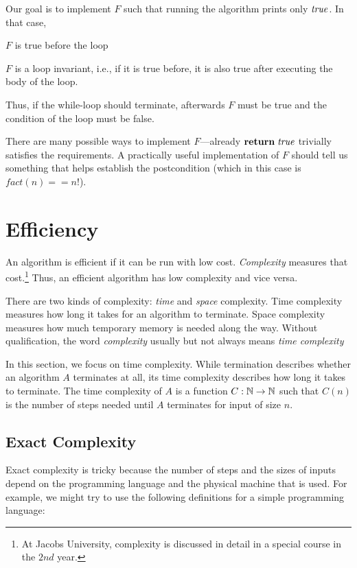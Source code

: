 Our goal is to implement $F$ such that running the algorithm prints only $\mathit{true}$.
In that case, 
\begin{compactitem}
 \item $F$ is true before the loop
 \item $F$ is a loop invariant, i.e., if it is true before, it is also true after executing the body of the loop.
\end{compactitem}
Thus, if the while-loop should terminate, afterwards $F$ must be true and the condition of the loop must be false.

There are many possible ways to implement $F$---already $\areturn{\true}$ trivially satisfies the requirements.
A practically useful implementation of $F$ should tell us something that helps establish the postcondition (which in this case is $fact(n)==n!$).


\section{Efficiency}\label{sec:ad:complex}

An algorithm is efficient if it can be run with low cost.
\emph{Complexity} measures that cost.\footnote{At Jacobs University, complexity is discussed in detail in a special course in the $2nd$ year.}
Thus, an efficient algorithm has low complexity and vice versa.

There are two kinds of complexity: \emph{time} and \emph{space} complexity.
Time complexity measures how long it takes for an algorithm to terminate.
Space complexity measures how much temporary memory is needed along the way.
Without qualification, the word \emph{complexity} usually but not always means \emph{time complexity}

In this section, we focus on time complexity.
While termination describes whether an algorithm $A$ terminates at all, its time complexity describes how long it takes to terminate.
The time complexity of $A$ is a function $C:\mathbb{N}\to\mathbb{N}$ such that $C(n)$ is the number of steps needed until $A$ terminates for input of size $n$.

\subsection{Exact Complexity}\label{sec:ad:complex:general}

Exact complexity is tricky because the number of steps and the sizes of inputs depend on the programming language and the physical machine that is used.
For example, we might try to use the following definitions for a simple programming language:

